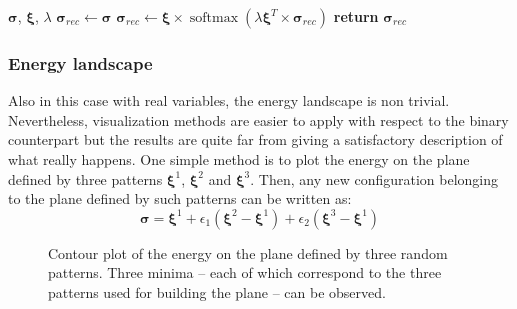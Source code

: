 \documentclass[\rootdir/main.tex]{subfiles}
\begin{document}
\begin{algorithm}
    \caption{Update function for the continuous \acrshort{mhm}}
    \label{alg:update_continuous_mhm}
    \begin{algorithmic}[1]
    \Require $\symbf{\sigma}$, $\symbf{\xi}$, $\lambda$
    \State $\symbf{\sigma}_{rec} \gets \symbf{\sigma}$
    \State $\symbf{\sigma}_{rec} \gets \symbf{\xi} \times \operatorname{softmax}\left(\lambda \symbf{\xi}^T \times \symbf{\sigma}_{rec}\right)$
    \State \textbf{return} $\symbf{\sigma}_{rec}$
\end{algorithmic}
\end{algorithm}

\subsubsection{Energy landscape}
Also in this case with real variables, the energy landscape is non trivial. Nevertheless, visualization methods are easier to apply with respect to the binary counterpart but the results are quite far from giving a satisfactory description of what really happens.
One simple method is to plot the energy on the plane defined by three patterns $\symbf{\xi}^1$, $\symbf{\xi}^2$ and $\symbf{\xi}^3$. Then, any new configuration belonging to the plane defined by such patterns can be written as:
\begin{equation*}
    \symbf{\sigma} = \symbf{\xi}^1 + \epsilon_1 \left(\symbf{\xi}^2 - \symbf{\xi}^1\right) + \epsilon_2 \left(\symbf{\xi}^3 - \symbf{\xi}^1\right)
\end{equation*}
\begin{figure}[hbt]
    \centering
    
    \caption{Contour plot of the energy on the plane defined by three random patterns. Three minima -- each of which correspond to the three patterns used for building the plane -- can be observed.}
\end{figure}

\subbibliography
\end{document}
